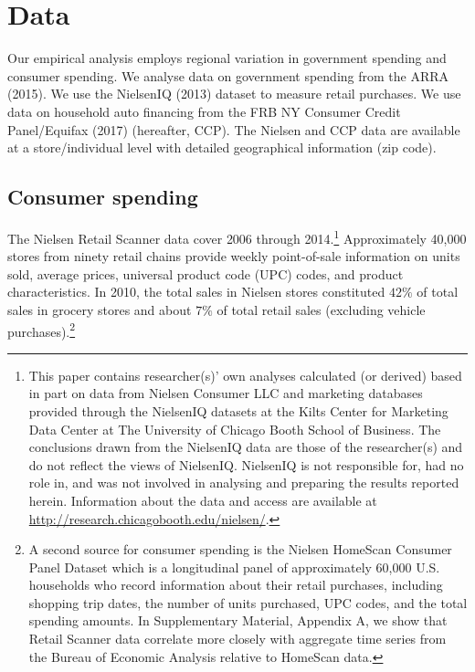 \documentclass[\latexroot/\projectname]{subfiles}
\begin{document}
\section{Data}
\whenintegrated{\label{sec:data}} %

Our empirical analysis employs regional variation in government spending and consumer spending. We analyse data on government spending from the ARRA (2015). We use the NielsenIQ (2013) dataset to measure retail purchases. We use data on household auto financing from the FRB NY Consumer Credit Panel/Equifax (2017) (hereafter, CCP). The Nielsen and CCP data are available at a store/individual level with detailed geographical information (zip code).

\subsection{Consumer spending}
The Nielsen Retail Scanner data cover 2006 through 2014.\footnote{This paper contains researcher(s)' own analyses calculated (or derived) based in part on data from Nielsen Consumer LLC and marketing databases provided through the NielsenIQ datasets at the Kilts Center for Marketing Data Center at The University of Chicago Booth School of Business. The conclusions drawn from the NielsenIQ data are those of the researcher(s) and do not reflect the views of NielsenIQ. NielsenIQ is not responsible for, had no role in, and was not involved in analysing and preparing the results reported herein. Information about the data and access are available at \href{http://research.chicagobooth.edu/nielsen/}{http://research.chicagobooth.edu/nielsen/}.} Approximately 40,000 stores from ninety retail chains provide weekly point-of-sale information on units sold, average prices, universal product code (UPC) codes, and product characteristics. In 2010, the total sales in Nielsen stores constituted $42 \%$ of total sales in grocery stores and about $7 \%$ of total retail sales (excluding vehicle purchases).\footnote{A second source for consumer spending is the Nielsen HomeScan Consumer Panel Dataset which is a longitudinal panel of approximately 60,000 U.S. households who record information about their retail purchases, including shopping trip dates, the number of units purchased, UPC codes, and the total spending amounts. In Supplementary Material, Appendix A, we show that Retail Scanner data correlate more closely with aggregate time series from the Bureau of Economic Analysis relative to HomeScan data.}
\end{document}

